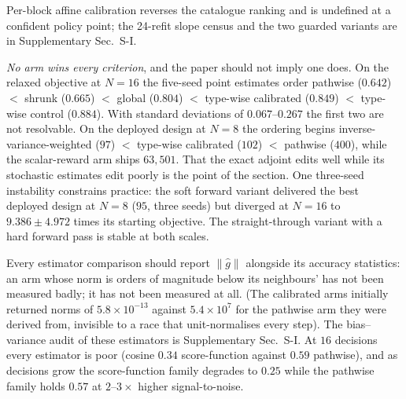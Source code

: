 \documentclass[journal]{IEEEtran}
\begin{document}

Per-block affine calibration reverses the catalogue ranking and is undefined at a
confident policy point; the 24-refit slope census and the two guarded variants are in
Supplementary Sec.~S-I.

\emph{No arm wins every criterion}, and the paper should not imply one does.  On
the relaxed objective at $N=16$ the five-seed point estimates order pathwise
($0.642$) $<$ shrunk ($0.665$) $<$ global ($0.804$) $<$ type-wise calibrated
($0.849$) $<$ type-wise control ($0.884$).  With standard deviations of
$0.067$--$0.267$ the first two are not resolvable.  On the deployed design at
$N=8$ the ordering begins inverse-variance-weighted ($97$) $<$ type-wise
calibrated ($102$) $<$ pathwise ($400$), while the scalar-reward arm ships
$63{,}501$.  That the exact adjoint edits well while its stochastic estimates edit poorly
is the point of the section.  One three-seed instability constrains
practice: the soft forward variant delivered the best deployed design at $N=8$
($95$, three seeds) but diverged at $N=16$ to $9.386\pm4.972$ times its starting objective.
The straight-through variant with a hard forward pass is stable at both scales.

Every estimator comparison should report $\|\hat g\|$ alongside its accuracy
statistics: an arm whose norm is orders of magnitude below its neighbours' has not been measured badly; it has not been measured at all. (The calibrated arms
initially returned norms of $5.8\times10^{-13}$ against $5.4\times10^{7}$ for the
pathwise arm they were derived from, invisible to a race that unit-normalises
every step).  The bias--variance audit of these
estimators is Supplementary Sec.~S-I. At $16$ decisions every estimator is poor
(cosine $0.34$ score-function against $0.59$ pathwise), and as decisions grow the
score-function family degrades to $0.25$ while the pathwise family holds $0.57$
at $2$--$3\times$ higher signal-to-noise.
\end{document}
